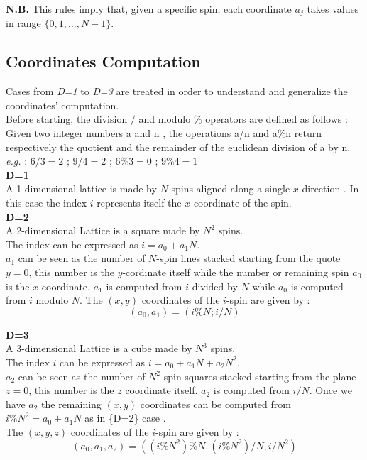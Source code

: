 \documentclass[11pt,a4paper]{article}
\begin{document}

\textbf{N.B.} This rules imply that, given a specific spin, each coordinate $a_j$ takes values in range
$\{0,1,…,N-1\}$. \\



\newpage


\subsection*{Coordinates Computation}

Cases from \textit{D=1} to \textit{D=3} are treated in order to understand and generalize the coordinates’ computation. \\
Before starting, the division $/$ and modulo $\%$ operators are defined as follows : \\
Given two integer numbers a and n , the operations a/n and a\%n return respectively the quotient and the remainder of the euclidean division of a by n. \\
\textit{e.g.} : $6/3=2$ ; $9/4=2$ ; $6\%3=0$ ; $9\%4=1$ \\

\vspace{0.1cm}
\textbf{D=1} \\
A 1-dimensional lattice is made by $N$ spins aligned along a single $x$ direction .
In this case the index $i$ represents itself the $x$ coordinate of the spin.\\

\textbf{D=2} \\
A 2-dimensional Lattice is a square made by $N^2$ spins.\\
The index can be expressed as $i = a_0 + a_1N$. \\
$a_1$ can be seen as the number of $N$-spin lines stacked starting from the quote $y=0$, this number is
the $y$-cordinate itself while the number or remaining spin $a_0$ is the $x$-coordinate.
$a_1$ is computed from $i$ divided by $N$ while $a_0$ is computed from $i$ modulo $N$.
The $(x,y)$ coordinates of the $i$-spin are given by : $$(a_0,a_1)=(i\%N ; i/N)$$


\textbf{D=3} \\
A 3-dimensional Lattice is a cube made by $N^{3}$ spins. \\
The index $i$ can be expressed as $i = a_0 + a_1N + a_2N^2$. \\
$a_2$ can be seen as the number of $N^2$-spin squares stacked starting from the plane $z=0$, this number is
the $z$ coordinate itself. $a_2$ is computed from $i/N$.
Once we have $a_2$ the remaining $(x,y)$ coordinates can be computed from \\ $i\%N^2 = a_0 + a_1N$ as in \{D=2\} case .\\
The $(x,y,z)$ coordinates of the $i$-spin are given by : $$(a_0,a_1,a_2)=\left( (i\%N^2)\%N , (i\%N^2)/N , i/N^2 \right)$$
\end{document}

